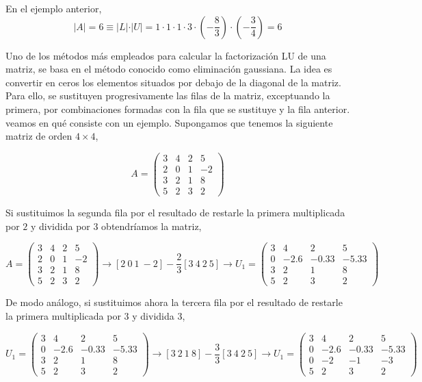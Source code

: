 En el ejemplo anterior,
\begin{equation*}
\vert A \vert = 6 \equiv \vert L \vert\cdot\vert U\vert =1 \cdot 1 \cdot 1 \cdot 3 \cdot (-\frac{8}{3})\cdot (-\frac{3}{4})=6    
\end{equation*}

Uno de los métodos más empleados para calcular la factorización LU de una matriz, se basa en el método conocido como eliminación gaussiana. La idea es convertir en ceros los elementos situados por debajo de la diagonal de la matriz. Para ello, se sustituyen progresivamente las filas de la matriz, exceptuando la primera, por combinaciones  formadas con la fila que se sustituye y la fila anterior.
 veamos en qué consiste con un ejemplo. Supongamos que tenemos la siguiente matriz de orden $4 \times 4$, 

\begin{equation*}
A=\begin{pmatrix}
3& 4& 2&5\\
2& 0& 1& -2\\
3& 2& 1& 8\\
5& 2& 3& 2
\end{pmatrix} 
\end{equation*}

Si sustituimos la segunda fila por el resultado de restarle la primera multiplicada por $2$ y dividida por $3$ obtendríamos la matriz,

\begin{equation*}
A=\begin{pmatrix}
3& 4& 2&5\\
2& 0& 1& -2\\
3& 2& 1& 8\\
5& 2& 3& 2
\end{pmatrix} \rightarrow [2\ 0\ 1\ -2]-\frac{2}{3} [3\ 4\ 2\ 5] \rightarrow U_1=\begin{pmatrix}
3& 4& 2&5\\
0& -2.6& -0.33& -5.33\\
3& 2& 1& 8\\
5& 2& 3& 2
\end{pmatrix}
\end{equation*}

De modo análogo, si sustituimos ahora la tercera fila por el resultado de restarle la primera multiplicada por $3$ y dividida $3$,
 
\begin{equation*}
U_1=\begin{pmatrix}
3& 4& 2&5\\
0& -2.6& -0.33& -5.33\\
3& 2& 1& 8\\
5& 2& 3& 2
\end{pmatrix} \rightarrow [3\ 2\ 1\ 8]-\frac{3}{3} [3\ 4\ 2\ 5] \rightarrow U_1=\begin{pmatrix}
3& 4& 2&5\\
0& -2.6& -0.33& -5.33\\
0& -2& -1& -3\\
5& 2& 3& 2
\end{pmatrix}
\end{equation*}


